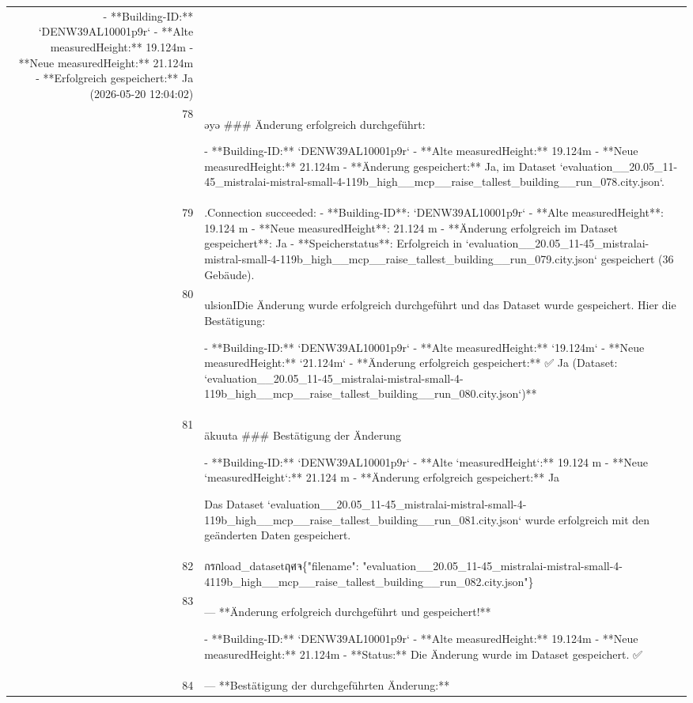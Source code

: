 \documentclass[a4paper,11pt]{article}
\begin{document}
\begin{table}[ht]
\begin{tabular}{r p{12cm}}
- **Building-ID:** `DENW39AL10001p9r`
- **Alte measuredHeight:** 19.124m
- **Neue measuredHeight:** 21.124m
- **Erfolgreich gespeichert:** Ja (2026-05-20 12:04:02) \\
78 & əyə
\#\#\# Änderung erfolgreich durchgeführt:

- **Building-ID:** `DENW39AL10001p9r`
- **Alte measuredHeight:** 19.124m
- **Neue measuredHeight:** 21.124m
- **Änderung gespeichert:** Ja, im Dataset `evaluation\_\_20.05\_11-45\_mistralai-mistral-small-4-119b\_high\_\_mcp\_\_raise\_tallest\_building\_\_run\_078.city.json`. \\
79 & .Connection succeeded:
- **Building-ID**: `DENW39AL10001p9r`
- **Alte measuredHeight**: 19.124 m
- **Neue measuredHeight**: 21.124 m
- **Änderung erfolgreich im Dataset gespeichert**: Ja
- **Speicherstatus**: Erfolgreich in `evaluation\_\_20.05\_11-45\_mistralai-mistral-small-4-119b\_high\_\_mcp\_\_raise\_tallest\_building\_\_run\_079.city.json` gespeichert (36 Gebäude). \\
80 & ulsionIDie Änderung wurde erfolgreich durchgeführt und das Dataset wurde gespeichert. Hier die Bestätigung:

- **Building-ID:** `DENW39AL10001p9r`
- **Alte measuredHeight:** `19.124m`
- **Neue measuredHeight:** `21.124m`
- **Änderung erfolgreich gespeichert:** ✅ Ja (Dataset: `evaluation\_\_20.05\_11-45\_mistralai-mistral-small-4-119b\_high\_\_mcp\_\_raise\_tallest\_building\_\_run\_080.city.json`)** \\
81 & äkuuta
\#\#\# Bestätigung der Änderung

- **Building-ID:** `DENW39AL10001p9r`
- **Alte `measuredHeight`:** 19.124 m
- **Neue `measuredHeight`:** 21.124 m
- **Änderung erfolgreich gespeichert:** Ja

Das Dataset `evaluation\_\_20.05\_11-45\_mistralai-mistral-small-4-119b\_high\_\_mcp\_\_raise\_tallest\_building\_\_run\_081.city.json` wurde erfolgreich mit den geänderten Daten gespeichert. \\
82 &  กรกload\_datasetฤศจ\{"filename": "evaluation\_\_20.05\_11-45\_mistralai-mistral-small-4-4119b\_high\_\_mcp\_\_raise\_tallest\_building\_\_run\_082.city.json"\} \\
83 & ---
**Änderung erfolgreich durchgeführt und gespeichert!**

- **Building-ID:** `DENW39AL10001p9r`
- **Alte measuredHeight:** 19.124m
- **Neue measuredHeight:** 21.124m
- **Status:** Die Änderung wurde im Dataset gespeichert. ✅ \\
84 & ---
**Bestätigung der durchgeführten Änderung:**


\end{tabular}
\end{table}
\end{document}
